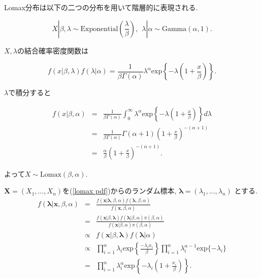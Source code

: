 \documentclass[12pt,dvipdfmx]{beamer}
\begin{document}
\begin{frame}


Lomax分布は以下の二つの分布を用いて階層的に表現される. 

$$
X|\beta, \lambda \sim \mbox{Exponential} \left(\frac{\lambda }{\beta }\right),~~
\lambda |\alpha \sim \mbox{Gamma}(\alpha ,1). 
$$

$X,\lambda $の結合確率密度関数は

$$
f(x|\beta ,\lambda )f(\lambda |\alpha )
=
\frac{1}{\beta \Gamma (\alpha )}\lambda ^{\alpha }\mbox{exp}
\left
\{-\lambda 
\left(1+\frac{x}{\beta }\right)
\right\}. 
$$

\end{frame}




\begin{frame}


$\lambda $で積分すると

\begin{eqnarray*}
f(x|\beta ,\alpha )
&=&
\frac{1}{\beta \Gamma (\alpha )}\int_{0}^{\infty }
\lambda ^{\alpha }\mbox{exp}
\left\{
-\lambda \left(1+\frac{x}{\beta }\right)
\right\}d\lambda \\ 
&=&
\frac{1}{\beta \Gamma (\alpha )}\Gamma(\alpha +1)
\left (1+\frac{x}{\beta }\right)^{-(\alpha +1)} \\
&=&
\frac{\alpha }{\beta }
\left(1+\frac{x}{\beta }\right)^{-(\alpha +1)}.
\end{eqnarray*}

よって$X \sim \mbox{Lomax}(\beta ,\alpha ).$

\end{frame}




\begin{frame}


$\bm{X}=(X_{1},\ldots,X_{n})$を(\ref{lomax pdf})からのランダム標本, $\bm{\lambda }=(\lambda_{1},\ldots,\lambda_{n})$
とする.
\begin{eqnarray*}
f(\bm{\lambda }|\bm{x},\beta ,\alpha )
&=&
\frac{f(\bm{x}|\bm{\lambda },\beta ,\alpha )f(\bm{\lambda },\beta ,\alpha )}
{f(\bm{x},\beta ,\alpha )} \\
&=&
\frac{f(\bm{x}|\beta ,\bm{\lambda })f(\bm{\lambda }|\beta ,\alpha )\pi(\beta ,\alpha )}
{f(\bm{x}|\beta ,\alpha )\pi(\beta ,\alpha )} \\
&\propto&
f(\bm{x}|\beta ,\bm{\lambda })f(\bm{\lambda }|\alpha ) \\
&\propto&
\prod_{i=1}^{n}\lambda _{i}\mbox{exp}\left\{\frac{-\lambda _{i}x_{i}}{\beta }\right\}
\prod_{i=1}^{n}\lambda _{i}^{\alpha -1}\mbox{exp}\{-\lambda _{i}\} \\
&=&
\prod_{i=1}^{n}\lambda _{i}^{\alpha }\mbox{exp}\left\{
-\lambda _{i}\left(1+\frac{x_{i}}{\beta }\right)
\right\}.
\end{eqnarray*}



\end{frame}
\end{document}
